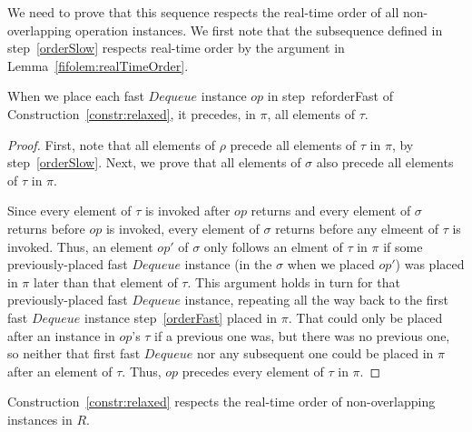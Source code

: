 \documentclass[a4paper,anonymous,USenglish]{lipics-v2021} %
\theoremstyle{definition}
\begin{document}

We need to prove that this sequence respects the real-time order of all non-overlapping operation instances.  We first note that the subsequence defined in step~\ref{orderSlow} respects real-time order by the argument in Lemma~\ref{fifolem:realTimeOrder}.

\begin{lemma}\label{ooolem:fastDeqOrdering}
  When we place each fast $Dequeue$ instance $op$ in step~ref{orderFast} of Construction~\ref{constr:relaxed}, it precedes, in $\pi$, all elements of $\tau$.
\end{lemma}

\begin{proof}
  First, note that all elements of $\rho$ precede all elements of $\tau$ in $\pi$, by step~\ref{orderSlow}.  Next, we prove that all elements of $\sigma$ also precede all elements of $\tau$ in $\pi$.

  Since every element of $\tau$ is invoked after $op$ returns and every element of $\sigma$ returns before $op$ is invoked, every element of $\sigma$ returns before any elmeent of $\tau$ is invoked.  Thus, an element $op'$ of $\sigma$ only follows an elment of $\tau$ in $\pi$ if some previously-placed fast $Dequeue$ instance (in the $\sigma$ when we placed $op'$) was placed in $\pi$ later than that element of $\tau$.  This argument holds in turn for that previously-placed fast $Dequeue$ instance, repeating all the way back to the first fast $Dequeue$ instance step~\ref{orderFast} placed in $\pi$.  That could only be placed after an instance in $op$'s $\tau$ if a previous one was, but there was no previous one, so neither that first fast $Dequeue$ nor any subsequent one could be placed in $\pi$ after an element of $\tau$.  Thus, $op$ precedes every element of $\tau$ in $\pi$.
\end{proof}

\begin{lemma}
  Construction~\ref{constr:relaxed} respects the real-time order of non-overlapping instances in $R$.
\end{lemma}
\end{document}

